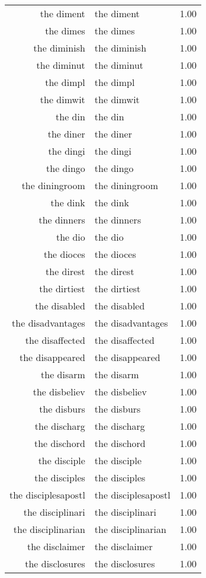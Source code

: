 \begin{table}[ht]
\begin{tabular}{rlr}
  the diment & the diment & 1.00 \\ 
  the dimes & the dimes & 1.00 \\ 
  the diminish & the diminish & 1.00 \\ 
  the diminut & the diminut & 1.00 \\ 
  the dimpl & the dimpl & 1.00 \\ 
  the dimwit & the dimwit & 1.00 \\ 
  the din & the din & 1.00 \\ 
  the diner & the diner & 1.00 \\ 
  the dingi & the dingi & 1.00 \\ 
  the dingo & the dingo & 1.00 \\ 
  the diningroom & the diningroom & 1.00 \\ 
  the dink & the dink & 1.00 \\ 
  the dinners & the dinners & 1.00 \\ 
  the dio & the dio & 1.00 \\ 
  the dioces & the dioces & 1.00 \\ 
  the direst & the direst & 1.00 \\ 
  the dirtiest & the dirtiest & 1.00 \\ 
  the disabled & the disabled & 1.00 \\ 
  the disadvantages & the disadvantages & 1.00 \\ 
  the disaffected & the disaffected & 1.00 \\ 
  the disappeared & the disappeared & 1.00 \\ 
  the disarm & the disarm & 1.00 \\ 
  the disbeliev & the disbeliev & 1.00 \\ 
  the disburs & the disburs & 1.00 \\ 
  the discharg & the discharg & 1.00 \\ 
  the dischord & the dischord & 1.00 \\ 
  the disciple & the disciple & 1.00 \\ 
  the disciples & the disciples & 1.00 \\ 
  the disciplesapostl & the disciplesapostl & 1.00 \\ 
  the disciplinari & the disciplinari & 1.00 \\ 
  the disciplinarian & the disciplinarian & 1.00 \\ 
  the disclaimer & the disclaimer & 1.00 \\ 
  the disclosures & the disclosures & 1.00 \\ 

\end{tabular}
\end{table}
